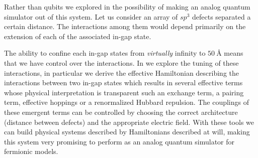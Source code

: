 Rather than qubits we explored in  the possibility of making an analog quantum simulator out of this system. Let us consider an array of $sp^3$ defects separated a certain distance.
The interactions among them would depend primarily on the extension of each of the associated in-gap state.

The ability to confine each in-gap states from \emph{virtually} infinity to $\SI{50}{\angstrom}$ means that we have control over the interactions. 
In  we explore the tuning of these interactions, in particular we derive the effective Hamiltonian describing the interactions between two in-gap states which results in several effective terms whose physical interpretation is transparent such an exchange term, a pairing term, effective hoppings or a renormalized Hubbard repulsion. The couplings of these emergent terms can be controlled by choosing the correct architecture (distance between defects) and the appropriate electric field.
With these tools we can build physical systems described by Hamiltonians described at will, making this system very promising to perform as an analog quantum simulator for fermionic models.
\medskip


